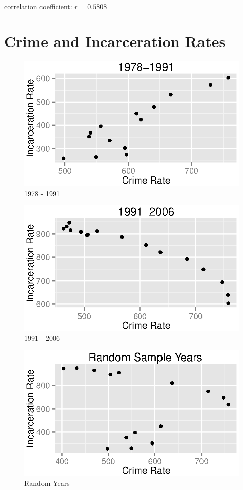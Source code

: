 \documentclass{exam}
\begin{document}
  correlation coefficient: $r = 0.5808$

  \section{Crime and Incarceration Rates}

  \begin{figure}[H]
    \centering
    \includegraphics{figures/crime/crime_vs_incarceration_1978-1991.eps}
    \caption{1978 - 1991}
  \end{figure}

  \begin{figure}[H]
    \centering
    \includegraphics{figures/crime/crime_vs_incarceration_1991-2006.eps}
    \caption{1991 - 2006}
  \end{figure}

  \begin{figure}[H]
    \centering
    \includegraphics{figures/crime/crime_vs_incarceration_sample.eps}
    \caption{Random Years}
  \end{figure}
\end{document}
